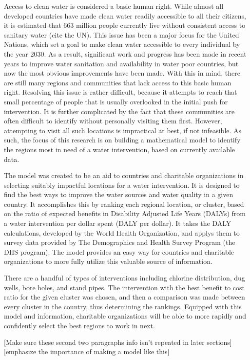 Access to clean water is considered a basic human right.
While almost all developed countries have made clean water readily accessible to all their citizens, it is estimated that 663 million people currently live without consistent access to sanitary water (cite the UN).
This issue has been a major focus for the United Nations, which set a goal to  make clean water accessible to every individual by the year 2030.
As a result, significant work and progress has been made in recent years to improve water sanitation and availability in water poor countries, but now the most obvious improvements have been made.
With this in mind, there are still many regions and communities that lack access to this basic human right.
Resolving this issue is rather difficult, because it attempts to reach that small percentage of people that is usually overlooked in the initial push for intervention.
It is further complicated by the fact that these communities are often difficult to identify without personally visiting them first.
However, attempting to visit all such locations is impractical at best, if not infeasible.
As such, the focus of this research is on building a mathematical model to identify the regions most in need of a water intervention, based on currently available data. 

The model was created to be an aid to countries and charitable organizations in selecting suitably impactful locations for a water intervention.
It is designed to find the best ways to improve the water sources and water quality in a given country.
It accomplishes this by ranking each regional location, or cluster, based on the ratio of expected benefits in Disability Adjusted Life Years (DALYs) from a water intervention per dollar spent (DALY per dollar).
It takes the DALY calculations, developed by the World Health Organization, and applys them to survey data provided by The Demographics and Health Survey Program (the DHS program).
The model provides an easy way for countries and charitable  organizations to more fully utilize this valuable source of information.

There are a handful of types of interventions including chlorine distribution, dug wells, bore holes, and stand pipes.
The intervention with the best benefit to cost ratio for the given cluster was chosen, and then a comparison was made between every cluster in the country, thus determining the rankings.
Equipped with this model and information, charitable organizations will be able to more rapidly and confidently select the best regions to work in next.

[Make sure these second two paragraphs info isn't repeated in later sections]
[emphasize the importance of making a model like this]
